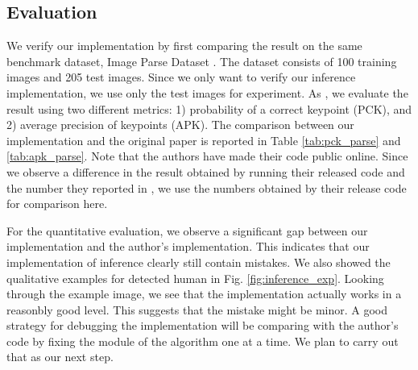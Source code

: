 \documentclass[10pt,twocolumn,letterpaper]{article}
\begin{document}
\subsection{Evaluation}
\label{sec:inference_eval}
We verify our implementation by first comparing the result on the same benchmark dataset, Image Parse Dataset \cite{Ramanan_NIPS2006}. The dataset consists of 100 training images and 205 test images. Since we only want to verify our inference implementation, we use only the test images for experiment. As \cite{Ramanan_NIPS2006}, we evaluate the result using two different metrics: 1) probability of a correct keypoint (PCK), and 2) average precision of keypoints (APK). The comparison between our implementation and the original paper is reported in Table \ref{tab:pck_parse} and \ref{tab:apk_parse}. Note that the authors have made their code public online. Since we observe a difference in the result obtained by running their released code and the number they reported in \cite{Ramanan_NIPS2006}, we use the numbers obtained by their release code for comparison here.

For the quantitative evaluation, we observe a significant gap between our implementation and the author's implementation. This indicates that our implementation of inference clearly still contain mistakes. We also showed the qualitative examples for detected human in Fig. \ref{fig:inference_exp}. Looking through the example image, we see that the implementation actually works in a reasonbly good level. This suggests that the mistake might be minor. A good strategy for debugging the implementation will be comparing with the author's code by fixing the module of the algorithm one at a time. We plan to carry out that as our next step.

\end{document}
